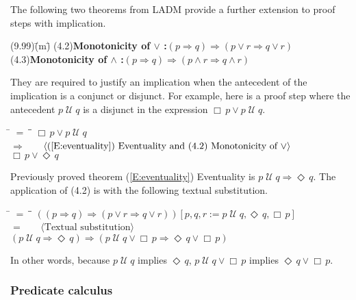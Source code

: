 \documentclass[12pt, fleqn, leqno]{article}
\newcommand{\lgap}{2pt}                             %
\newcommand{\mymathindent}{24pt}                    %
\newcommand{\impl}{\ensuremath{\Rightarrow}}        %
\newcommand{\Until}{\;\mathcal{U}\;}
\newcommand{\Event}{\Diamond\,}
\newcommand{\Always}{\Box\,}
\newcommand{\myqedtab}{\hspace{384pt}}              %
\newcommand{\Gll} {\langle}                         %
\newcommand{\Ggg} {\rangle}                         %
\newcommand{\Hint}[1]     {\ \ \ $\Gll              \mbox{#1} \Ggg$ }   %
\begin{document}
The following two theorems from LADM provide a further extension to proof steps with implication.
\begin{tabbing}
(9.99)\;\=(m)\;\=\kill
(4.2)\>\textbf{Monotonicity of $\lor$ :}\quad $(p\impl q) \impl (p\lor r \impl q\lor r)$\\[\lgap]
(4.3)\>\textbf{Monotonicity of $\land$ :}\quad $(p\impl q) \impl (p\land r \impl q\land r)$
\end{tabbing}
They are required to justify an implication when the antecedent of the implication is a conjunct or disjunct.
For example, here is a proof step where the antecedent $p\Until q$ is a disjunct in the expression $\Always p\lor p \Until q$.
\begin{tabbing}
\hspace{\mymathindent} \= $= \;$ \= \myqedtab \= \kill
\> \> $\Always p\lor p \Until q$\\[\lgap]
\> $\impl$ \> \Hint{(\ref{E:eventuality}) Eventuality and (4.2) Monotonicity of $\lor$} \\[\lgap]
\> \> $\Always p\lor \Event q$
\end{tabbing}
Previously proved theorem (\ref{E:eventuality}) Eventuality is $p \Until q \impl \Event q$.
The application of (4.2) is with the following textual substitution.
\begin{tabbing}
\hspace{\mymathindent} \= $= \;$ \= \myqedtab \= \kill
\> \> $((p\impl q) \impl (p\lor r \impl q\lor r))[p,q,r := p\Until q, \Event q, \Always p]$\\[\lgap]
\> $=$ \> \Hint{Textual substitution} \\[\lgap]
\> \> $(p\Until q\impl \Event q) \impl (p\Until q\lor \Always p \impl \Event q\lor \Always p)$
\end{tabbing}
In other words, because $p\Until q$ implies $\Event q$, $p\Until q\lor \Always p$ implies $\Event q\lor \Always p$.

\subsubsection{Predicate calculus}
\end{document}

